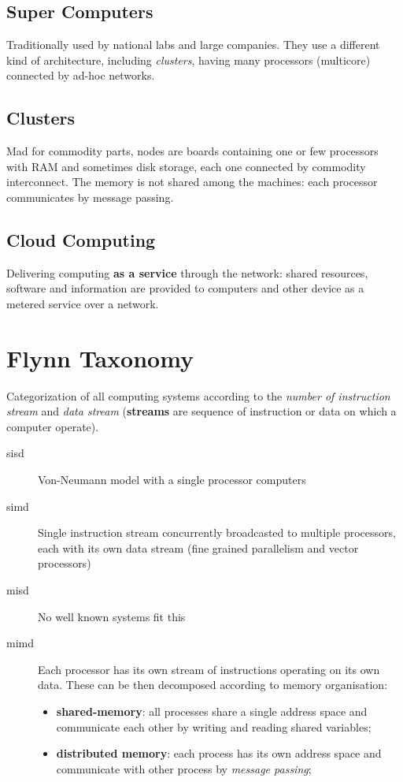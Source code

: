 \subsection{Super Computers}\label{sub:ow_super_computers} %
Traditionally used by national labs and large companies.
They use a different kind of architecture, including \textit{clusters}, having many processors (multicore) connected by ad-hoc networks.
%
\subsection{Clusters}\label{sub:ow_clusters} %
Mad for commodity parts, nodes are boards containing one or few processors with RAM and sometimes disk storage, each one connected by commodity interconnect.
The memory is not shared among the machines: each processor communicates by message passing.
%
\subsection{Cloud Computing}\label{sub:ow_cloud_computing} %
Delivering computing \textbf{as a service} through the network: shared resources, software and information are provided to computers and other device as a metered service over a network.
%
\section{Flynn Taxonomy}\label{sec:ow_flynn_taxonomy} %
Categorization of all computing systems according to the \textit{number of instruction stream} and \textit{data stream} (\textbf{streams} are sequence of instruction or data on which a computer operate).
\begin{description}
    \item[\ac{sisd}] Von-Neumann model with a single processor computers
    \item[\ac{simd}] Single instruction stream concurrently broadcasted to multiple processors, each with its own data stream (fine grained parallelism and vector processors)
    \item[\ac{misd}] No well known systems fit this
    \item[\ac{mimd}] Each processor has its own stream of instructions operating on its own data.
        These can be then decomposed according to memory organisation:
        \begin{itemize}
            \item \textbf{shared-memory}: all processes share a single address space and communicate each other by writing and reading shared variables;
            \item \textbf{distributed memory}: each process has its own address space and communicate with other process by \textit{message passing};
        \end{itemize}
\end{description}
%
